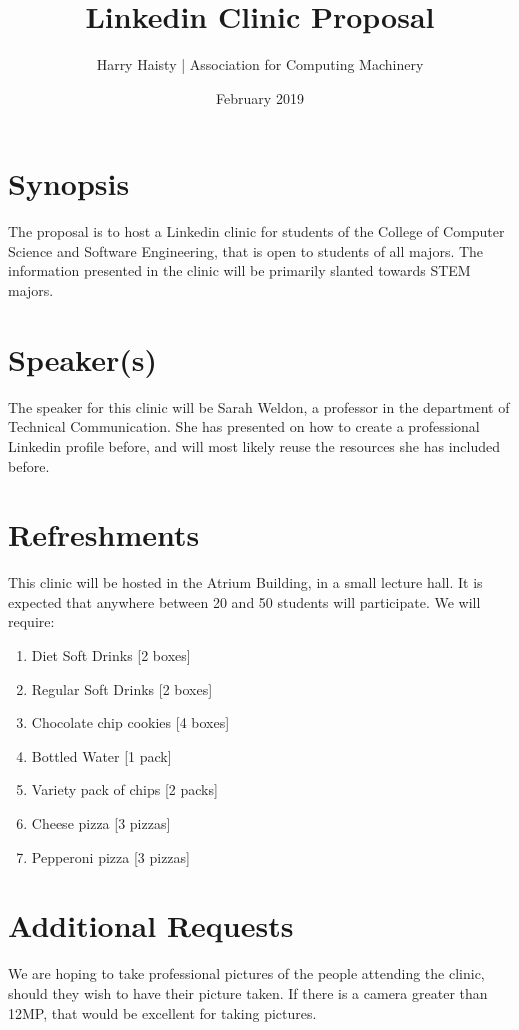 \documentclass[11pt]{article}
\title{Linkedin Clinic Proposal}
\author{Harry Haisty | Association for Computing Machinery}
\date{February 2019}
\begin{document}
\maketitle

\section*{Synopsis}
The proposal is to host a Linkedin clinic for students of the College of Computer Science and Software Engineering, that is open to students of all majors. The information presented in the clinic will be primarily slanted towards STEM majors. 

\section*{Speaker(s)}
The speaker for this clinic will be Sarah Weldon, a professor in the department of Technical Communication. She has presented on how to create a professional Linkedin profile before, and will most likely reuse the resources she has included before. 

\section*{Refreshments}
This clinic will be hosted in the Atrium Building, in a small lecture hall. It is expected that anywhere between 20 and 50 students will participate. We will require: 
\begin{enumerate}
    \item Diet Soft Drinks [2 boxes]
    \item Regular Soft Drinks [2 boxes]
    \item Chocolate chip cookies [4 boxes]
    \item Bottled Water [1 pack]
    \item Variety pack of chips [2 packs]
    \item Cheese pizza [3 pizzas]
    \item Pepperoni pizza [3 pizzas]
\end{enumerate}

\section*{Additional Requests}
We are hoping to take professional pictures of the people attending the clinic, should they wish to have their picture taken. If there is a camera greater than 12MP, that would be excellent for taking pictures. 
\end{document}
